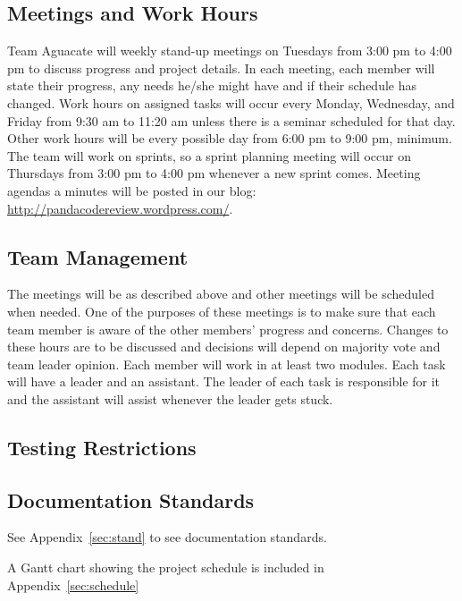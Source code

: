 
\subsection{Meetings and Work Hours}
Team Aguacate will weekly stand-up meetings on Tuesdays from 3:00 pm to 4:00 pm to discuss progress and project details. In each meeting, each member will state their progress, any needs he/she might have and if their schedule has changed. Work hours on assigned tasks will occur every Monday, Wednesday, and Friday from 9:30 am to 11:20 am unless there is a seminar scheduled for that day. Other work hours will be every possible day from 6:00 pm to 9:00 pm, minimum. The team will work on sprints, so a sprint planning meeting will occur on Thursdays from 3:00 pm to 4:00 pm whenever a new sprint comes.  Meeting agendas a minutes will be posted in our blog: \url{http://pandacodereview.wordpress.com/}.

\subsection{Team Management}
The meetings will be as described above and other meetings will be scheduled when needed. One of the purposes of these meetings is to make sure that each team member is aware of the other members' progress and concerns. Changes to these hours are to be discussed and decisions will depend on majority vote and team leader opinion. Each member will work in at least two modules. Each task will have a leader and an assistant. The leader of each task is responsible for it and the assistant will assist whenever the leader gets stuck. 

\subsection{Testing Restrictions}

\subsection{Documentation Standards}
See Appendix~\ref{sec:stand} to see documentation standards.

A Gantt chart showing the project schedule is included in Appendix~\ref{sec:schedule} 